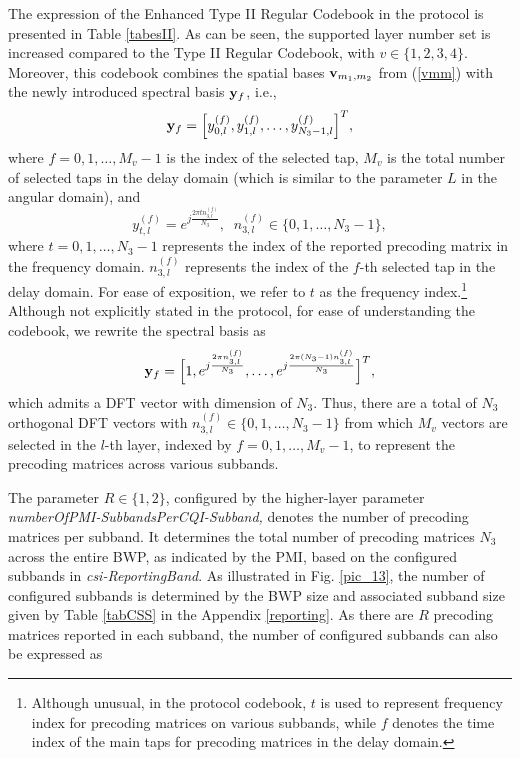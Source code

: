 \documentclass[lettersize,journal]{IEEEtran}
\begin{document}
The expression of the Enhanced Type II Regular Codebook in the protocol is presented in Table \ref{tabesII}. As can be seen, the supported layer number set is increased compared to the Type II Regular Codebook, with \(v\in\{1,2,3,4\}\). Moreover, this codebook combines the spatial bases ${\bf{v}}_{{m_1},m_2}$ from (\ref{vmm}) with the newly introduced spectral basis ${{\bf{y}}_f}$, i.e., 
\begin{equation}
 {{\bf{y}}_f} = {\left[ {y_{0,l}^{(f)},y_{1,l}^{(f)},\ldots,y_{{N_3} - 1,l}^{(f)}} \right]^T},   
\end{equation}
where $f=0,1,\ldots,M_v-1$ is the index of the selected tap, $M_v$ is the total number of selected taps in the delay domain (which is similar to the parameter $L$ in the angular domain), and 
\begin{equation}\label{b45}
y_{t,l}^{(f)} = {e^{j\frac{{2\pi tn_{3,l}^{(f)}}}{{{N_3}}}}},\;\;n_{3,l}^{(f)} \in \{ 0,1,\ldots,{N_3} - 1\},
\end{equation}
where $t=0,1,\ldots,N_3-1$ represents the index of the reported precoding matrix in the frequency domain. $n_{3,l}^{(f)}$ represents the index of the $f$-th selected tap in the delay domain. For ease of exposition, we refer to $t$ as the frequency index.\footnote{Although unusual, in the protocol codebook, $t$ is used to represent frequency index for precoding matrices on various subbands, while $f$ denotes the time index of the main taps for precoding matrices in the delay domain.} Although not explicitly stated in the protocol, for ease of understanding the codebook, we rewrite the spectral basis  as 
\begin{equation}\label{b46}
{{\bf{y}}_f} = {\Big[ {1,{e^{j\frac{{2\pi n_{3,l}^{(f)}}}{{{N_3}}}}},\ldots,{e^{j\frac{{2\pi ({N_3} - 1)n_{3,l}^{(f)}}}{{{N_3}}}}}} \Big]^T},    
\end{equation}
which admits a DFT vector with dimension of $N_3$. Thus, there are a total of $N_3$ orthogonal DFT vectors with $n_{3,l}^{(f)}\in \{0,1,\ldots,N_3-1\}$ from which $M_v$ vectors are selected in the $l$-th layer, indexed by $f=0,1,\ldots,M_v-1$, to represent the precoding matrices across various subbands. 


The parameter $R \in \{1,2\}$, configured by the higher-layer parameter \emph{numberOfPMI-SubbandsPerCQI-Subband,} denotes the number of precoding matrices per subband. It determines the total number of precoding matrices $N_3$ across the entire BWP, as indicated by the PMI, based on the configured subbands in \emph{csi-ReportingBand}. As illustrated in Fig. \ref{pic_13}, the number of configured subbands is determined by the BWP size and associated subband size given by Table \ref{tabCSS} in the Appendix \ref{reporting}. As there are $R$ precoding matrices reported in each subband, the number of configured subbands can also be expressed as
\end{document}
